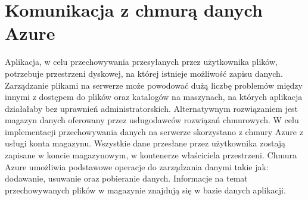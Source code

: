 \section{Komunikacja z chmurą danych Azure}
{
Aplikacja, w celu przechowywania przesyłanych przez użytkownika plików, potrzebuje przestrzeni dyskowej, na której istnieje możliwość zapisu danych. Zarządzanie plikami na serwerze może powodować dużą liczbę problemów między innymi z dostępem do plików oraz katalogów na maszynach, na których aplikacja działałaby bez uprawnień administratorskich. Alternatywnym rozwiązaniem jest magazyn danych oferowany przez usługodawców rozwiązań chmurowych. W celu implementacji przechowywania danych na serwerze skorzystano z chmury Azure z usługi konta magazynu. Wszystkie dane przesłane przez użytkownika zostają zapisane w koncie magazynowym, w kontenerze właściciela przestrzeni. Chmura Azure umożliwia podstawowe operacje do zarządzania danymi takie jak: dodawanie, usuwanie oraz pobieranie danych. Informacje na temat przechowywanych plików w magazynie znajdują się w bazie danych aplikacji.
}